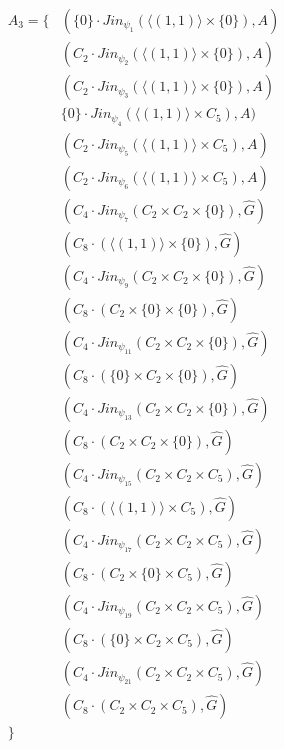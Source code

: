 \documentclass{article}
\begin{document}
\begin{enumerate}
    \begin{align*}
    A_3 = \{   & ( \{0\} \cdot Jin_{\psi_{1}}(\langle (1,1) \rangle \times \{0\} ) , A )  \\
   & ( C_{2} \cdot Jin_{\psi_{2}}(\langle (1,1) \rangle \times \{0\} ) , A )  \\
   & ( C_{2} \cdot Jin_{\psi_{3}}(\langle (1,1) \rangle \times \{0\} ) , A )  \\
   & \{0\} \cdot Jin_{\psi_{4}}(\langle (1,1) \rangle \times C_5) , A )  \\
   & ( C_{2} \cdot Jin_{\psi_{5}}(\langle (1,1) \rangle \times C_5) , A )  \\
   & ( C_{2} \cdot Jin_{\psi_{6}}(\langle (1,1) \rangle \times C_5) , A )  \\
   & ( C_{4} \cdot Jin_{\psi_{7}}(C_2 \times C_2 \times \{0\} ) , \hat{G} ) \\
   & ( C_{8} \cdot (\langle (1,1) \rangle \times \{0\} ) , \hat{G} ) \\
   & ( C_{4} \cdot Jin_{\psi_{9}}(C_2 \times C_2 \times \{0\} ) , \hat{G} ) \\
   & ( C_{8} \cdot(C_2 \times \{0\}  \times \{0\} ) , \hat{G} ) \\
   & ( C_{4} \cdot Jin_{\psi_{11}}(C_2 \times C_2 \times \{0\} ) , \hat{G} ) \\
   & ( C_{8} \cdot(\{0\} \times C_2 \times \{0\} ) , \hat{G} ) \\
   & ( C_{4} \cdot Jin_{\psi_{13}}(C_2 \times C_2 \times \{0\} ) , \hat{G} ) \\
   & ( C_{8} \cdot(C_2 \times C_2 \times \{0\} ) , \hat{G} ) \\
   & ( C_{4} \cdot Jin_{\psi_{15}}(C_2 \times C_2 \times C_5) , \hat{G} ) \\
   & ( C_{8} \cdot(\langle (1,1) \rangle \times C_5) , \hat{G} ) \\
   & ( C_{4} \cdot Jin_{\psi_{17}}(C_2 \times C_2 \times C_5) , \hat{G} ) \\
   & ( C_{8} \cdot(C_2 \times \{0\}  \times C_5) , \hat{G} ) \\
   & ( C_{4} \cdot Jin_{\psi_{19}}(C_2 \times C_2 \times C_5) , \hat{G} ) \\
   & ( C_{8} \cdot (\{0\} \times C_2 \times C_5) , \hat{G} ) \\
   & ( C_{4} \cdot Jin_{\psi_{21}}(C_2 \times C_2 \times C_5) , \hat{G} ) \\
   & ( C_{8} \cdot (C_2 \times C_2 \times C_5) , \hat{G} ) \\
    \}
\end{align*}
\end{enumerate}
\end{document}
